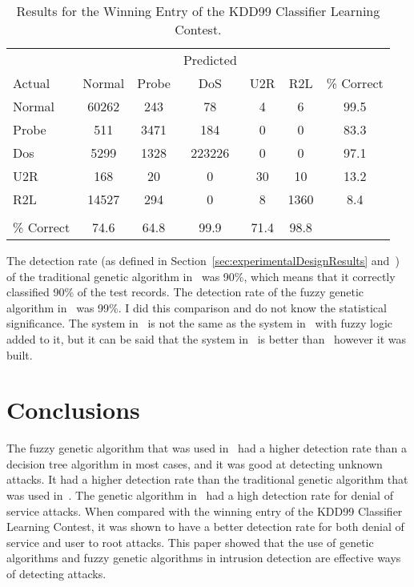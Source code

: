 \documentclass{sig-alternate}
\begin{document}
\begin{table*}
\center
\caption{Results for the Winning Entry of the KDD99 Classifier Learning Contest.}
\vspace{0.20cm}
\begin{tabular}{l|cccccc}
& & & Predicted & & &\\
Actual & Normal & Probe & DoS & U2R & R2L & \% Correct \\ \hline
Normal &  60262 & 243 & 78 & 4 & 6 & 99.5\\
Probe &  511 & 3471 & 184 & 0 & 0 & 83.3 \\
Dos &  5299 & 1328 & 223226 & 0 & 0 & 97.1\\
U2R &  168 & 20 & 0 & 30 & 10 & 13.2\\
R2L &  14527 & 294 & 0 & 8 & 1360 & 8.4\\
& &&&&& \\
\% Correct &  74.6 & 64.8 & 99.9 & 71.4 & 98.8 &\\
\end{tabular}
\center
\label{tab:winningEntry}
\end{table*}

The detection rate (as defined in Section~\ref{sec:experimentalDesignResults} and~\cite{6559603}) of the traditional genetic algorithm in~\cite{DBLP:journals/corr/abs-1204-1336} was 90\%, which means that it correctly classified 90\% of the test records. The detection rate of the fuzzy genetic algorithm in~\cite{6559603} was 99\%. I did this comparison and do not know the statistical significance. The system in~\cite{6559603} is not the same as the system in~\cite{DBLP:journals/corr/abs-1204-1336} with fuzzy logic added to it, but it can be said that the system in~\cite{6559603} is better than~\cite{DBLP:journals/corr/abs-1204-1336} however it was built.

\section{Conclusions}
\label{sec:conclusion}
The fuzzy genetic algorithm that was used in~\cite{6496342, 6559603} had a higher detection rate than a decision tree algorithm in most cases, and it was good at detecting unknown attacks. It had a higher detection rate than the traditional genetic algorithm that was used in~\cite{DBLP:journals/corr/abs-1204-1336}. The genetic algorithm in~\cite{DBLP:journals/corr/abs-1204-1336} had a high detection rate for denial of service attacks. When compared with the winning entry of the KDD99 Classifier Learning Contest, it was shown to have a better detection rate for both denial of service and user to root attacks. This paper showed that the use of genetic algorithms and fuzzy genetic algorithms in intrusion detection are effective ways of detecting attacks.
\end{document}
